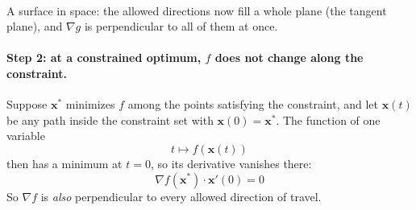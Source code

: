 \documentclass[]{article}
\begin{document}
\begin{center}
\begin{minipage}[t]{0.46\textwidth}
			\\[0.4em]
			{\scriptsize A surface in space: the allowed directions now fill a whole plane (the tangent plane), and $\nabla g$ is perpendicular to all of them at once.}
		\end{minipage}
	\end{center}

	\paragraph{Step 2: at a constrained optimum, $f$ does not change along the constraint.}
	Suppose $\mathbf{x}^*$ minimizes $f$ among the points satisfying the constraint, and let $\mathbf{x}(t)$ be any path inside the constraint set with $\mathbf{x}(0) = \mathbf{x}^*$.
	The function of one variable
	$$
	t \longmapsto f(\mathbf{x}(t))
	$$
	then has a minimum at $t = 0$, so its derivative vanishes there:
	$$
	\nabla f(\mathbf{x}^*) \cdot \mathbf{x}'(0) = 0
	$$
	So $\nabla f$ is \textit{also} perpendicular to every allowed direction of travel.
\end{document}
